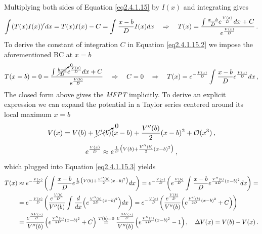 \documentclass[../main.tex]{subfiles}
\begin{document}
Multiplying both sides of Equation \eqref{eq2.4.1.15} by $I(x)$ and integrating gives
\begin{equation}\label{eq2.4.1.15.2}
        \int_{}^{}(T(x)I(x))'dx = T(x)I(x) - C =\int_{}^{}\frac{x-b}{D}I(x)dx \quad\Rightarrow\quad T(x) = \frac{\int_{}^{}\frac{x-b}{D}e^{\frac{V(x)}{D}}dx+C}{e^{\frac{V(x)}{D}}}\,.
\end{equation}
To derive the constant of integration $C$ in Equation \eqref{eq2.4.1.15.2} we impose the aforementioned BC at $x=b$
\begin{equation}\label{eq2.4.1.15.3}
        T(x=b)=0=\frac{\int_{}^{}\cancelto{0}{\frac{b-b}{D}}e^{\frac{V(x)}{D}}dx+C}{e^{\frac{V(b)}{D}}} \quad\Rightarrow\quad C=0 \quad\Rightarrow\quad T(x)=e^{-\frac{V(x)}{D}}\int_{}^{}\frac{x-b}{D}e^{\frac{V(x)}{D}}dx\,,
\end{equation}
The closed form above gives the \textit{MFPT} implicitly.
To derive an explicit expression we can expand the potential in a Taylor series centered around its local maximum $x=b$ 
\begin{equation*}
     V(x) = V(b)+\cancelto{0}{V'(b)}(x-b)+\frac{V''(b)}{2}(x-b)^{2}+\mathcal{O}(x^{3})\,,
\end{equation*}
\begin{equation*}
        e^{\frac{V(x)}{D}} \approx e^{\frac{1}{D}\big(V(b)+\frac{V''(b)}{2}(x-b)^{2}\big)}\,, 
\end{equation*}
which plugged into Equation \eqref{eq2.4.1.15.3} yields
\begin{align}
        T(x) &\approx e^{-\frac{V(x)}{D}}\bigg(\int_{}^{}\frac{x-b}{D}e^{\frac{1}{D}\big(V(b)+\frac{V''(b)}{2}(x-b)^{2}\big)}dx\bigg) = e^{-\frac{V(x)}{D}}\bigg(e^{\frac{V(b)}{D}}\int_{}^{}\frac{x-b}{D}e^{\frac{V''(b)}{2D}(x-b)^{2}}dx\bigg) = \nonumber \\
             &= e^{-\frac{V(x)}{D}}\bigg(\frac{e^{\frac{V(b)}{D}}}{V''(b)}\int_{}^{}\frac{d}{dx}\Big(e^{\frac{V''(b)}{2D}(x-b)^{2}}\Big)dx\bigg) = e^{-\frac{V(x)}{D}}\bigg(\frac{e^{\frac{V(b)}{D}}}{V''(b)}\Big(e^{\frac{V''(b)}{2D}(x-b)^{2}} + C\Big)\bigg)\nonumber \\
             &=  \frac{e^{\frac{\Delta V(x)}{D}}}{V''(b)}\Big(e^{\frac{V''(b)}{2D}(x-b)^{2}} + C\Big)\stackrel{T(b)=0}{=}\frac{e^{\frac{\Delta V(x)}{D}}}{V''(b)}\Big(e^{\frac{V''(b)}{2D}(x-b)^{2}} - 1\Big)\,,\quad\Delta V(x)=V(b)-V(x)\,. \label{eq2.4.1.15.4}
\end{align}
\color{black}
\end{document}
